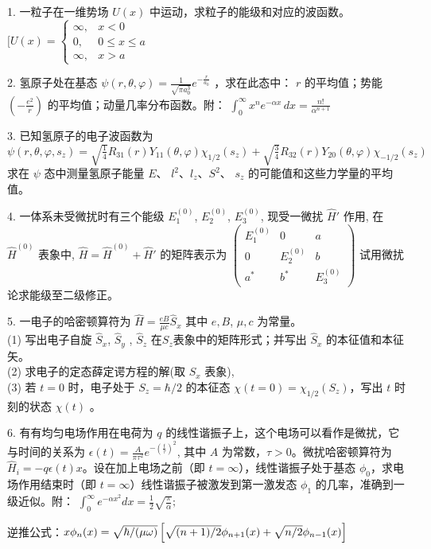 1. 一粒子在一维势场 $U(x)$ 中运动，求粒子的能级和对应的波函数。
$[ U(x) = \begin{cases} \infty, & x < 0 \\0, & 0 \le x \le a \\\infty, & x > a \end{cases}$

2. 氢原子处在基态 $\psi (r, \theta, \varphi) = \frac{1}{\sqrt{\pi a_0^3}} e^{-\frac{r}{a_0}}$ ，求在此态中： $r$ 的平均值；势能 $( -\frac{e^2}{r} )$ 的平均值；动量几率分布函数。附： 
$\int_0^\infty x^n e^{-\alpha x} \, dx = \frac{n!}{\alpha^{n+1}}$

3. 已知氢原子的电子波函数为 
$\psi(r, \theta, \varphi, s_z) = \sqrt{\frac{1}{4}} R_{31}(r) Y_{11}(\theta, \varphi) \chi_{1/2}(s_z) + \sqrt{\frac{3}{4}} R_{32}(r) Y_{20}(\theta, \varphi) \chi_{-1/2}(s_z)$
求在 $\psi$ 态中测量氢原子能量 $E$、 $l^2$、$l_z$、$ S^2 $、 $s_z$ 的可能值和这些力学量的平均值。

4. 一体系未受微扰时有三个能级 $E_1^{(0)}$, $E_2^{(0)}$, $E_3^{(0)}$, 现受一微扰 $\hat{H}'$ 作用, 在 $\hat{H}^{(0)}$ 表象中, 
$\hat{H} = \hat{H}^{(0)} + \hat{H}'$
的矩阵表示为
$\begin{pmatrix}E_1^{(0)} & 0 & a \\0 & E_2^{(0)} & b \\a^* & b^* & E_3^{(0)}\end{pmatrix}$
试用微扰论求能级至二级修正。

5. 一电子的哈密顿算符为
$\hat{H} = \frac{eB}{\mu c} \hat{S}_x$
其中 $e, B$, $\mu, c$ 为常量。\\
(1) 写出电子自旋 $\hat{S}_x $, $\hat{S}_y$ , $\hat{S}_z$  在$S_z$表象中的矩阵形式；并写出 $\hat{S}_x$ 的本征值和本征矢。\\
(2) 求电子的定态薛定谔方程的解(取 $S_x$ 表象),\\
(3) 若 $t = 0$ 时，电子处于 $S_z = \hbar/2$ 的本征态 $\chi(t=0) = \chi_{1/2}(S_z)$，写出 $t$ 时刻的状态 $\chi(t)$ 。


6. 有有均匀电场作用在电荷为 $q$ 的线性谐振子上，这个电场可以看作是微扰，它与时间的关系为 
$\epsilon(t) = \frac{A}{\pi \tau^2} e^{-\left(\frac{t}{\tau}\right)^2}$,
其中 $A$ 为常数，$\tau > 0$。微扰哈密顿算符为 $\hat{H}_i = -q\epsilon(t)x$。设在加上电场之前（即 $t = \infty$），线性谐振子处于基态 $\phi_0$，求电场作用结束时（即 $t = \infty$）线性谐振子被激发到第一激发态 $\phi_1$ 的几率，准确到一级近似。附：
$\int_{0}^{\infty} e^{-\alpha x^2} dx = \frac{1}{2} \sqrt{\frac{\pi}{\alpha}};$

逆推公式：$x \phi_n(x) = \sqrt{\hbar / (\mu \omega)} \left[ \sqrt{(n+1)/2} \\ \phi_{n+1}(x) + \sqrt{n/2} \\ \phi_{n-1}(x) \right]$

